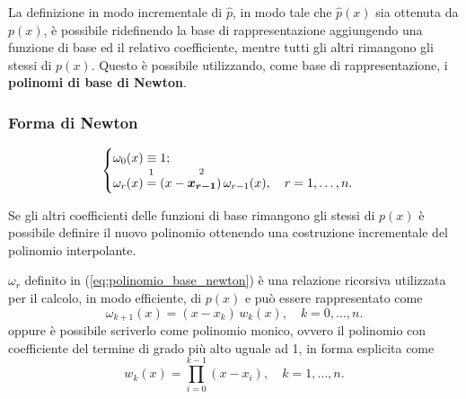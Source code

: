 La definizione in modo incrementale di $\widehat{p}$, in modo tale che $\widehat p(x)$ sia ottenuta da $p(x)$, è possibile ridefinendo la base di  rappresentazione aggiungendo una funzione di base ed il relativo coefficiente, mentre tutti gli altri rimangono gli stessi di $p(x)$. Questo è possibile utilizzando, come base di rappresentazione, i \textbf{polinomi di base di Newton}.

\subsubsection{Forma di Newton}

\begin{definition}
	\begin{equation}\label{eq:polinomio_base_newton}
	    \begin{cases}
	        \omega_0(x)\equiv 1;\\
			\omega_r(x)\overset{\footnotemark}{=}(x-\overset{\footnotemark}{\boldsymbol{x_{r-1}}})\,\omega_{r-1}(x),\quad r=1,\hdots,n.
	    \end{cases}
	\end{equation}
\end{definition}
\addtocounter{footnote}{-1}


Se gli altri coefficienti delle funzioni di base rimangono gli stessi di $p(x)$ è possibile definire il nuovo polinomio ottenendo una costruzione incrementale del polinomio interpolante.

\begin{remark}
	$\omega_r$ definito in (\ref{eq:polinomio_base_newton}) è una relazione ricorsiva utilizzata per il calcolo, in modo efficiente, di $p(x)$ e può essere rappresentato come
	\begin{equation*}
	    \omega_{k+1}(x)=(x-x_k)\, w_k(x),\quad k=0,\hdots, n.
	\end{equation*}
	oppure è possibile scriverlo come polinomio monico, ovvero il polinomio con coefficiente del termine di grado più alto uguale ad 1, in forma esplicita come
	\begin{equation}\label{polinomio_base_newton2}
	    w_k(x)=\prod_{i=0}^{k-1}(x-x_i),\quad k=1,\hdots,n.
	\end{equation}
\end{remark}

